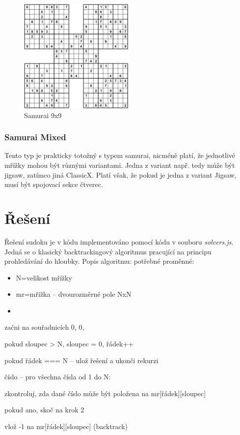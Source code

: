 \documentclass[a4paper,oneside,12pt]{report}
\begin{document}
\begin{figure}[H]
   \centering
   \includegraphics[width=0.5\textwidth]{../img/9x9samurai.png}
   \caption[Samurai 9x9]{Samurai 9x9}
   \label{fig:9x9samurai}
\end{figure}

\subsubsection{Samurai Mixed}
Tento typ je prakticky totožný s typem samurai, nicméně platí, že jednotlivé mřížky mohou být různými variantami. Jedna z variant např. tedy může být jigsaw, zatímco jiná ClassicX. Platí však, že pokud je jedna z variant Jigsaw, musí být spojovací sekce čtverec.

\section{Řešení}
Řešení sudoku je v kódu implementováno pomocí kódu v souboru \textit{solvers.js}. Jedná se o klasický backtrackingový algoritmus pracující na principu prohledávání do hloubky. Popis algoritmu:
potřebné proměnné:
\begin{itemize}
   \item N=velikost mřížky
   \item mr=mřížka -- dvourozměrné pole NxN
   \item
\end{itemize}
\begin{algEnumerate}
   \item začni na souřadnicích 0, 0,
   \item pokud sloupec > N, sloupec = 0, řádek++
   \item pokud řádek === N -- ulož řešení a ukonči rekurzi
   \item číslo -- pro všechna čísla od 1 do N:
   \begin{algEnumerate}
      \item zkontroluj, zda dané číslo může být položena na mr[řádek][sloupec]
      \item pokud ano, skoč na krok 2
   \end{algEnumerate}
   \item vlož -1 na mr[řádek][sloupec] (backtrack)
\end{algEnumerate}
\end{document}
